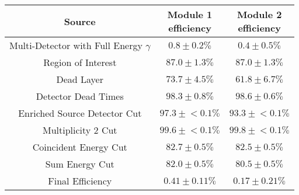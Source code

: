 \begin{tabular}{|c|c|c|}
\hline
  Source & \makecell{Module 1\\efficiency} & \makecell{Module 2\\efficiency} \\
\hline
  \makecell{Multi-Detector with\\Full Energy $\gamma$} & $0.8 \pm 0.2\%$ & $0.4 \pm 0.5\%$ \\
  Region of Interest & $87.0 \pm 1.3\%$ & $87.0 \pm 1.3\%$ \\
  Dead Layer & $73.7 \pm 4.5\%$ & $61.8 \pm 6.7\%$ \\
  Detector Dead Times & $98.3 \pm 0.8\%$ & $98.6 \pm 0.6\%$ \\
  Enriched Source Detector Cut & $97.3 \pm{}<\!0.1\%$ & $93.3 \pm{}<\!0.1\%$ \\
  Multiplicity 2 Cut & $99.6 \pm{}<\!0.1\%$ & $99.8 \pm{}<\!0.1\%$ \\
  Coincident Energy Cut & $82.7 \pm 0.5\%$ & $82.5 \pm 0.5\%$ \\
  Sum Energy Cut & $82.0 \pm 0.5\%$ & $80.5 \pm 0.5\%$ \\
  \hline Final Efficiency & $0.41 \pm 0.11\%$ & $0.17 \pm 0.21\%$ \\
\hline
\end{tabular}
